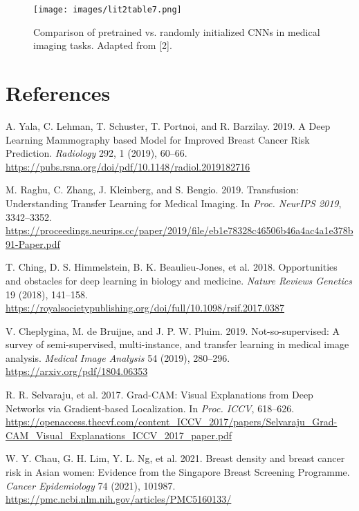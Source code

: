 \documentclass[12pt]{article}
\begin{document}
\begin{figure}[H]
    \centering
    \texttt{[image: images/lit2table7.png]}
    \caption{Comparison of pretrained vs. randomly initialized CNNs in medical imaging tasks. Adapted from [2].}
    \label{fig:lit2table7}
\end{figure}

\newpage
\section{References}
\begin{thebibliography}{99}

    A. Yala, C. Lehman, T. Schuster, T. Portnoi, and R. Barzilay. 2019. A Deep Learning Mammography based Model for Improved Breast Cancer Risk Prediction. \textit{Radiology} 292, 1 (2019), 60–66. \url{https://pubs.rsna.org/doi/pdf/10.1148/radiol.2019182716}
    
    M. Raghu, C. Zhang, J. Kleinberg, and S. Bengio. 2019. Transfusion: Understanding Transfer Learning for Medical Imaging. In \textit{Proc. NeurIPS 2019}, 3342–3352. \url{https://proceedings.neurips.cc/paper/2019/file/eb1e78328c46506b46a4ac4a1e378b91-Paper.pdf}
    
    T. Ching, D. S. Himmelstein, B. K. Beaulieu-Jones, et al. 2018. Opportunities and obstacles for deep learning in biology and medicine. \textit{Nature Reviews Genetics} 19 (2018), 141–158. \url{https://royalsocietypublishing.org/doi/full/10.1098/rsif.2017.0387}
    
    V. Cheplygina, M. de Bruijne, and J. P. W. Pluim. 2019. Not-so-supervised: A survey of semi-supervised, multi-instance, and transfer learning in medical image analysis. \textit{Medical Image Analysis} 54 (2019), 280–296. \url{https://arxiv.org/pdf/1804.06353}
    
    R. R. Selvaraju, et al. 2017. Grad-CAM: Visual Explanations from Deep Networks via Gradient-based Localization. In \textit{Proc. ICCV}, 618–626. \url{https://openaccess.thecvf.com/content_ICCV_2017/papers/Selvaraju_Grad-CAM_Visual_Explanations_ICCV_2017_paper.pdf}
    
    W. Y. Chau, G. H. Lim, Y. L. Ng, et al. 2021. Breast density and breast cancer risk in Asian women: Evidence from the Singapore Breast Screening Programme. \textit{Cancer Epidemiology} 74 (2021), 101987. \url{https://pmc.ncbi.nlm.nih.gov/articles/PMC5160133/}
    

\end{thebibliography}
\end{document}
